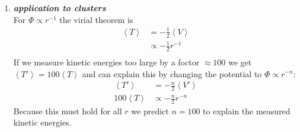 \documentclass[a4paper,12pt]{article}
\newcommand{\question}[1]{\textbf{\textit{#1}}}
\begin{document}
\begin{enumerate}
			\setcounter{equation}{0}
			\item \question{application to clusters}\\
			For $\Phi\propto r^{-1}$ the virial theorem is 
			\begin{align}
			\left< T\right> &= -\frac{1}{2}\left< V\right>\\
			&\propto -\frac{1}{2}r^{-1}\\
			\end{align}
			If we measure kinetic energies too large by a foctor $\approx 100$ we get $\left < T'\right >=100\left < T\right >$ and can explain this by changing the potential to $\Phi\propto r^{-n}$:
			\begin{align}
			\left < T'\right > &= -\frac{n}{2}\left < V'\right >\\
			100\left < T \right > &\propto -\frac{n}{2} r^{-n}
			\end{align} 
			Because this must hold for all $r$ we predict $n=100$ to explain the measured kinetic energies.
			
			
			
		\end{enumerate}
	
\end{document}
